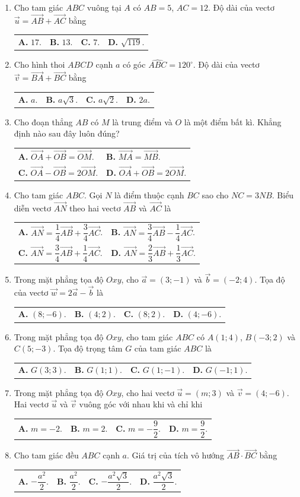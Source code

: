 \documentclass[12pt,a4paper]{article}
\makeatletter
\newcommand{\four}[4]{\par\nopagebreak\vspace{1.5pt}\noindent\begin{tabularx}{\linewidth}{@{}*{4}{>{\raggedright\arraybackslash}X}@{}}\textbf{A.} #1&\textbf{B.} #2&\textbf{C.} #3&\textbf{D.} #4\end{tabularx}}
\newcommand{\two}[4]{\par\nopagebreak\vspace{1.5pt}\noindent\begin{tabularx}{\linewidth}{@{}*{2}{>{\raggedright\arraybackslash}X}@{}}\textbf{A.} #1&\textbf{B.} #2\\[3.8pt]\textbf{C.} #3&\textbf{D.} #4\end{tabularx}}
\makeatother
\begin{document}
\begin{enumerate}[resume*]

\item Cho tam giác $ABC$ vuông tại $A$ có $AB = 5$, $AC = 12$. Độ dài của vectơ $\vec{u} = \vec{AB} + \vec{AC}$ bằng
\four{$17$.}{$13$.}{$7$.}{$\sqrt{119}$.}

\item Cho hình thoi $ABCD$ cạnh $a$ có góc $\widehat{ABC} = 120^\circ$. Độ dài của vectơ $\vec{v} = \vec{BA} + \vec{BC}$ bằng
\four{$a$.}{$a\sqrt{3}$.}{$a\sqrt{2}$.}{$2a$.}

\item Cho đoạn thẳng $AB$ có $M$ là trung điểm và $O$ là một điểm bất kì. Khẳng định nào sau đây luôn đúng?
\two{$\vec{OA} + \vec{OB} = \vec{OM}$.}{$\vec{MA} = \vec{MB}$.}{$\vec{OA} - \vec{OB} = 2\vec{OM}$.}{$\vec{OA} + \vec{OB} = 2\vec{OM}$.}

\item Cho tam giác $ABC$. Gọi $N$ là điểm thuộc cạnh $BC$ sao cho $NC = 3NB$. Biểu diễn vectơ $\vec{AN}$ theo hai vectơ $\vec{AB}$ và $\vec{AC}$ là
\two{$\vec{AN} = \dfrac{1}{4}\vec{AB} + \dfrac{3}{4}\vec{AC}$.}{$\vec{AN} = \dfrac{3}{4}\vec{AB} - \dfrac{1}{4}\vec{AC}$.}{$\vec{AN} = \dfrac{3}{4}\vec{AB} + \dfrac{1}{4}\vec{AC}$.}{$\vec{AN} = \dfrac{2}{3}\vec{AB} + \dfrac{1}{3}\vec{AC}$.}

\item Trong mặt phẳng tọa độ $Oxy$, cho $\vec{a} = (3; -1)$ và $\vec{b} = (-2; 4)$. Tọa độ của vectơ $\vec{w} = 2\vec{a} - \vec{b}$ là
\four{$(8; -6)$.}{$(4; 2)$.}{$(8; 2)$.}{$(4; -6)$.}

\item Trong mặt phẳng tọa độ $Oxy$, cho tam giác $ABC$ có $A(1; 4)$, $B(-3; 2)$ và $C(5; -3)$. Tọa độ trọng tâm $G$ của tam giác $ABC$ là
\four{$G(3; 3)$.}{$G(1; 1)$.}{$G(1; -1)$.}{$G(-1; 1)$.}

\item Trong mặt phẳng tọa độ $Oxy$, cho hai vectơ $\vec{u} = (m; 3)$ và $\vec{v} = (4; -6)$. Hai vectơ $\vec{u}$ và $\vec{v}$ vuông góc với nhau khi và chỉ khi
\four{$m = -2$.}{$m = 2$.}{$m = -\dfrac{9}{2}$.}{$m = \dfrac{9}{2}$.}

\item Cho tam giác đều $ABC$ cạnh $a$. Giá trị của tích vô hướng $\vec{AB} \cdot \vec{BC}$ bằng
\four{$-\dfrac{a^2}{2}$.}{$\dfrac{a^2}{2}$.}{$-\dfrac{a^2\sqrt{3}}{2}$.}{$\dfrac{a^2\sqrt{3}}{2}$.}


\end{enumerate}
\end{document}
